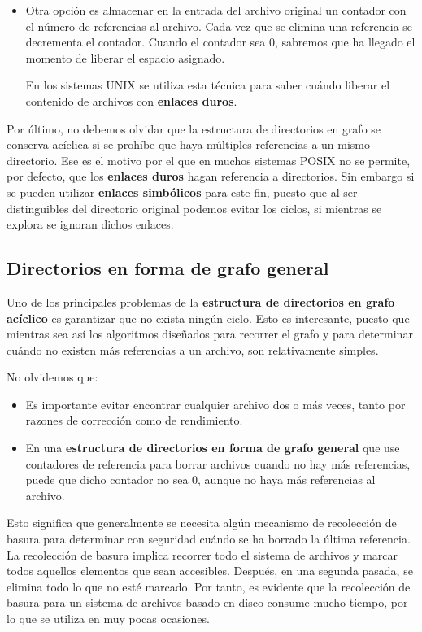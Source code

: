 \begin{itemize}
\item
  Otra opción es almacenar en la entrada del archivo original un
  contador con el número de referencias al archivo. Cada vez que se
  elimina una referencia se decrementa el contador. Cuando el contador
  sea 0, sabremos que ha llegado el momento de liberar el espacio
  asignado.

  En los sistemas UNIX se utiliza esta técnica para saber cuándo liberar
  el contenido de archivos con \textbf{enlaces duros}.
\end{itemize}

Por último, no debemos olvidar que la estructura de directorios en grafo
se conserva acíclica si se prohíbe que haya múltiples referencias a un
mismo directorio. Ese es el motivo por el que en muchos sistemas POSIX
no se permite, por defecto, que los \textbf{enlaces duros} hagan
referencia a directorios. Sin embargo si se pueden utilizar
\textbf{enlaces simbólicos} para este fin, puesto que al ser
distinguibles del directorio original podemos evitar los ciclos, si
mientras se explora se ignoran dichos enlaces.

\subsection{Directorios en forma de grafo
general}\label{_directorios_en_forma_de_grafo_general}

Uno de los principales problemas de la \textbf{estructura de directorios
en grafo acíclico} es garantizar que no exista ningún ciclo. Esto es
interesante, puesto que mientras sea así los algoritmos diseñados para
recorrer el grafo y para determinar cuándo no existen más referencias a
un archivo, son relativamente simples.

No olvidemos que:

\begin{itemize}
\item
  Es importante evitar encontrar cualquier archivo dos o más veces,
  tanto por razones de corrección como de rendimiento.
\item
  En una \textbf{estructura de directorios en forma de grafo general}
  que use contadores de referencia para borrar archivos cuando no hay
  más referencias, puede que dicho contador no sea 0, aunque no haya más
  referencias al archivo.
\end{itemize}

Esto significa que generalmente se necesita algún mecanismo de
recolección de basura para determinar con seguridad cuándo se ha borrado
la última referencia. La recolección de basura implica recorrer todo el
sistema de archivos y marcar todos aquellos elementos que sean
accesibles. Después, en una segunda pasada, se elimina todo lo que no
esté marcado. Por tanto, es evidente que la recolección de basura para
un sistema de archivos basado en disco consume mucho tiempo, por lo que
se utiliza en muy pocas ocasiones.


